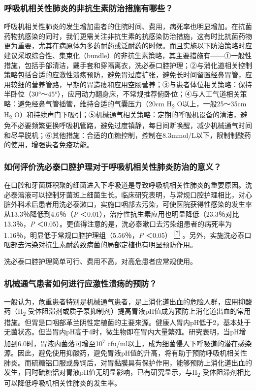 \subsubsection{呼吸机相关性肺炎的非抗生素防治措施有哪些？}

呼吸机相关性肺炎的发生增加患者的住院时间、费用，病死率也明显增加。在抗菌药物抗感染的同时，我们更需关注非抗生素的抗感染防治措施，这有时比抗菌药物更为重要，尤其在病原体为多药耐药或泛耐药的时候。而且实施以下防治策略时应建议采取综合性、集束化（bundle）的非抗生素策略，其主要措施有------①一般性措施，包括手部清洁，戴手套和穿隔离衣，洗必泰口腔护理；②与消化道相关控制策略包括合适的应激性溃疡预防，避免胃过度扩张，避免长时间留置经鼻胃管，应用较细的营养管路，早期的胃造瘘和应用空肠营养；③与患者体位相关策略：保持半卧位（30°～45°），应用动力翻身床，不常规推荐俯卧位；④与人工气道相关策略：避免经鼻气管插管，维持合适的气囊压力（20cm
H\textsubscript{2} O以上，一般25～35cm H\textsubscript{2}
O）和持续声门下吸引；⑤机械通气相关策略：定期的呼吸机设备的清洁，避免不必要频繁更换呼吸机管路，避免过度镇静，每日间断唤醒，减少机械通气时间和尽早脱机；⑥其他措施：合适的血糖控制，控制在8.3mmol/L以下，限制制酸药的使用，增强患者免疫功能。

\subsubsection{如何评价洗必泰口腔护理对于呼吸机相关性肺炎防治的意义？}

在口腔和牙菌斑积聚的细菌进入下呼吸道是导致呼吸机相关性肺炎的重要原因。洗必泰溶液可以控制牙菌斑上细菌生长。临床研究表明，与常规口腔护理相比，对心脏外科术后患者用洗必泰漱口，实施口咽部去污染，可使医院获得性感染的发生率从13.3％降低到4.6％（\emph{P}
＜0.01），治疗性抗生素应用也明显降低（23.3％对比13.3％，\emph{P}
＜0.05）。更值得注意的是，洗必泰漱口去污染组患者的病死率为1.16％，明显低于常规口腔护理组（5.56％，\emph{P}
＜0.05）
\protect\hyperlink{text00014.htmlux5cux23ch7-13}{\textsuperscript{{[}7{]}}}
。另外，实施洗必泰口咽部去污染对抗生素耐药致病菌的局部定植也有明显预防作用。

洗必泰口腔护理简单可行、费用不高，对高危患者应常规使用。

\subsubsection{机械通气患者如何进行应激性溃疡的预防？}

一般认为，危重患者特别是机械通气患者，是上消化道出血的危险人群，应用抑酸药（H\textsubscript{2}
受体阻滞剂或质子泵抑制剂）提高胃液pH值成为预防上消化道出血的常用措施。但胃是口咽部革兰阴性定植菌的主要来源。健康人胃内pH低于2，基本处于无菌状态。但当胃内pH高于4时，微生物即在胃内大量繁殖。研究表明，当pH增加到6.0时，胃液内菌落可增至10\textsuperscript{7}
cfu/ml以上，成为细菌侵入下呼吸道的潜在感染源。因此，避免使用抑酸药，避免胃液pH值的升高，将有助于预防呼吸机相关性肺炎。而硫糖铝口服或鼻饲后，对胃黏膜具有保护作用，能够预防上消化道出血的发生，同时硫糖铝对胃液pH值无明显影响，已有研究显示，与H\textsubscript{2}
受体阻滞剂相比可以降低呼吸机相关性肺炎的发生率。

